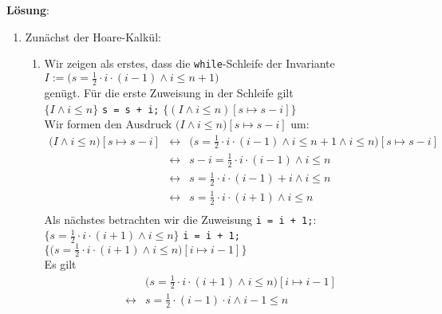 \documentclass{article}
\renewcommand{\labelenumii}{\arabic{enumii}.}
\begin{document}
\noindent
\textbf{L\"osung}:
\begin{enumerate}
\item Zun\"achst der Hoare-Kalk\"ul:
\begin{enumerate}
      \renewcommand{\labelenumii}{\arabic{enumii}.}
\item Wir zeigen als erstes, dass die \texttt{while}-Schleife der Invariante 
      \\[0.2cm]
      \hspace*{1.3cm}
      $I := \bigl(s = \frac{1}{2} \cdot i \cdot (i - 1) \wedge i \leq n + 1\bigr)$ 
      \\[0.2cm]
      gen\"ugt.  
      F\"ur die erste Zuweisung in der Schleife gilt
      \\[0.2cm]
      \hspace*{1.3cm}
      $\{ I \wedge i \leq n \}$ \quad \texttt{s = s + i;} \quad $\{ (I \wedge i \leq n)[s \mapsto s - i] \}$
      \\[0.2cm]
      Wir formen den Ausdruck $\bigl(I \wedge i \leq n\bigr)[s \mapsto s - i]$ um:
      \begin{eqnarray*}
        \bigl(I \wedge i \leq n\bigr)[s \mapsto s - i] 
        & \leftrightarrow & \bigl(s = \frac{1}{2} \cdot i \cdot (i-1) \wedge i \leq n+1 \wedge i \leq n\bigr)[s \mapsto s - i] \\
        & \leftrightarrow & s - i = \frac{1}{2} \cdot i \cdot (i-1) \wedge i \leq n \\
        & \leftrightarrow & s = \frac{1}{2} \cdot i \cdot (i-1) + i \wedge i \leq n \\
        & \leftrightarrow & s = \frac{1}{2} \cdot i \cdot (i+1) \wedge i \leq n \\
      \end{eqnarray*}
      Als n\"achstes betrachten wir die Zuweisung \texttt{i = i + 1;}:
      \\[0.2cm]
      \hspace*{1.3cm}
      $\{ s = \frac{1}{2} \cdot i \cdot (i+1) \wedge i \leq n \}$ \quad \texttt{i = i + 1;} \quad
      $\{ \bigl(s = \frac{1}{2} \cdot i \cdot (i+1)\wedge i \leq n\bigr)[i \mapsto i - 1] \}$ 
      \\[0.2cm]
      Es gilt 
      \begin{eqnarray*}        
      &                 & \bigl(s = \frac{1}{2} \cdot i \cdot (i+1)\wedge i \leq n\bigr)[i \mapsto i - 1] \\
      & \leftrightarrow & s = \frac{1}{2} \cdot (i-1) \cdot i \wedge i - 1 \leq n                         \\

\end{eqnarray*}
\end{enumerate}
\end{enumerate}
\end{document}
